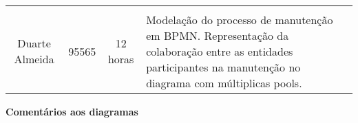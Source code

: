 \documentclass{article}
\begin{document}
\begin{table}[H]
\begin{tabular}{|l|l|l|l|l}
        \multicolumn{1}{|l|}{}                   & \multicolumn{1}{l|}{}       & \multicolumn{1}{l|}{}                             & \multicolumn{1}{l|}{}                   &  \\ \cline{1-4}
        \multicolumn{1}{|l|}{}                   & \multicolumn{1}{l|}{}       & \multicolumn{1}{l|}{}                             & \multirow{5}{7cm}{Modelação do processo de manutenção em BPMN. Representação da colaboração entre as entidades participantes na manutenção no diagrama com múltiplicas pools.}                   &  \\
        \multicolumn{1}{|l|}{}                   & \multicolumn{1}{l|}{}       & \multicolumn{1}{l|}{}                             & \multicolumn{1}{l|}{}                   &  \\
        \multicolumn{1}{|c|}{Duarte Almeida}     & \multicolumn{1}{c|}{95565}  & \multicolumn{1}{c|}{12 horas}                     & \multicolumn{1}{l|}{}                   &  \\
        \multicolumn{1}{|l|}{}                   & \multicolumn{1}{l|}{}       & \multicolumn{1}{l|}{}                             & \multicolumn{1}{l|}{}                   &  \\
        \multicolumn{1}{|l|}{}                   & \multicolumn{1}{l|}{}       & \multicolumn{1}{l|}{}                             & \multicolumn{1}{l|}{}                   &  \\ \cline{1-4}
        \end{tabular}
        \end{table}

    \vspace{0.3cm}

    \noindent \large \textbf{Comentários aos diagramas}
\end{document}
